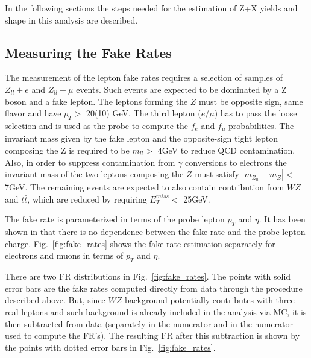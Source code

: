 In the following sections the steps needed for the estimation of Z+X yields and shape in this analysis are described.

\subsection{Measuring the Fake Rates}
\label{subsec:fr_method}
The measurement of the lepton fake rates requires a selection of samples of $Z_{ll}+e$ and $Z_{ll}+\mu$ events. Such events are expected to be dominated by a Z boson and a fake lepton. The leptons forming the $Z$ must be opposite sign, same flavor and have $p_{T} >$ 20(10) GeV. The third lepton ($e/\mu$) has to pass the loose selection and is used as the probe to compute the $f_{e}$ and $f_{\mu}$ probabilities. The invariant mass given by the fake lepton and the opposite-sign tight lepton composing the Z is required to be $m_{ll} >$ 4GeV to reduce QCD contamination. Also, in order to suppress contamination from $\gamma$ conversions to electrons the invariant mass of the two leptons composing the $Z$ must satisfy $|m_{Z_{ll}}-m_{Z}| <$ 7GeV. The remaining events are expected to also contain contribution from $WZ$ and $t\bar{t}$, which are reduced by requiring $E_{T}^{miss} <$ 25GeV.

The fake rate is parameterized in terms of the probe lepton $p_{T}$ and $\eta$. It has been shown in \cite{bib:CMS-AN-16-328} that there is no dependence between the fake rate and the probe lepton charge. Fig.~\ref{fig:fake_rates} shows the fake rate estimation separately for electrons and muons in terms of $p_{T}$ and $\eta$.

There are two FR distributions in Fig.~\ref{fig:fake_rates}. The points with solid error bars are the fake rates computed directly from data through the procedure described above. But, since $WZ$ background potentially contributes with three real leptons and such background is already included in the analysis via MC, it is then subtracted from data (separately in the numerator and in the numerator used to compute the FR's). The resulting FR after this subtraction is shown by the points with dotted error bars in Fig.~\ref{fig:fake_rates}. 

